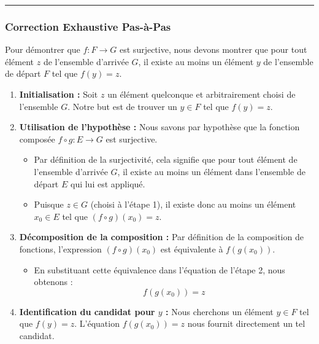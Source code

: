 \documentclass[12pt,a4paper]{report}
\providecommand{\tightlist}{%
  \setlength{\itemsep}{0pt}\setlength{\parskip}{0pt}}
\begin{document}
\begin{center}\rule{0.5\linewidth}{0.5pt}\end{center}

\subsubsection{Correction Exhaustive
Pas-à-Pas}\label{correction-exhaustive-pas-uxe0-pas}

Pour démontrer que \(f: F \to G\) est surjective, nous devons montrer
que pour tout élément \(z\) de l'ensemble d'arrivée \(G\), il existe au
moins un élément \(y\) de l'ensemble de départ \(F\) tel que
\(f(y) = z\).

\begin{enumerate}
\def\labelenumi{\arabic{enumi}.}
\item
  \textbf{Initialisation :} Soit \(z\) un élément quelconque et
  arbitrairement choisi de l'ensemble \(G\). Notre but est de trouver un
  \(y \in F\) tel que \(f(y) = z\).
\item
  \textbf{Utilisation de l'hypothèse :} Nous savons par hypothèse que la
  fonction composée \(f \circ g: E \to G\) est surjective.

  \begin{itemize}
  \tightlist
  \item
    Par définition de la surjectivité, cela signifie que pour tout
    élément de l'ensemble d'arrivée \(G\), il existe au moins un élément
    dans l'ensemble de départ \(E\) qui lui est appliqué.
  \item
    Puisque \(z \in G\) (choisi à l'étape 1), il existe donc au moins un
    élément \(x_0 \in E\) tel que \((f \circ g)(x_0) = z\).
  \end{itemize}
\item
  \textbf{Décomposition de la composition :} Par définition de la
  composition de fonctions, l'expression \((f \circ g)(x_0)\) est
  équivalente à \(f(g(x_0))\).

  \begin{itemize}
  \tightlist
  \item
    En substituant cette équivalence dans l'équation de l'étape 2, nous
    obtenons : \[f(g(x_0)) = z\]
  \end{itemize}
\item
  \textbf{Identification du candidat pour \(y\) :} Nous cherchons un
  élément \(y \in F\) tel que \(f(y) = z\). L'équation \(f(g(x_0)) = z\)
  nous fournit directement un tel candidat.


\end{enumerate}
\end{document}
